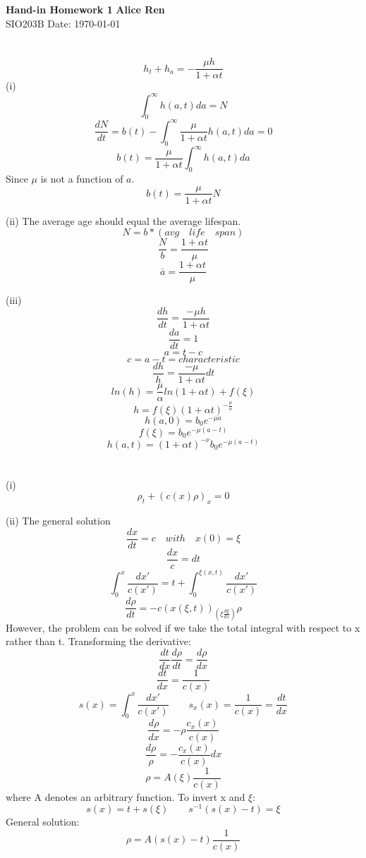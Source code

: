 \documentclass[letterpaper, 11pt]{article}
\begin{document}
\noindent
\large\textbf{Hand-in Homework 1} \hfill \textbf{Alice Ren} \\
\normalsize SIO203B \hfill Date: \today \\

\setlength{\parindent}{0pt}

\section{} %
\[h_t + h_a = -\frac{\mu h}{1+\alpha t}\]
(i)
\[\int_{0}^{\infty} h(a,t) da = N\]
\[\frac{dN}{dt} = b(t) - \int_{0}^{\infty} \frac{\mu}{1+\alpha t} h(a,t) da = 0\]
\[b(t) = \frac{\mu}{1+\alpha t} \int_{0}^{\infty} h(a,t) da \]
Since $\mu$ is not a function of $a$.
\[b(t) = \frac{\mu}{1+\alpha t} N\]

(ii)
The average age should equal the average lifespan.
\[N = b *(avg \quad life \quad span)\]
\[\frac{N}{b} = \frac{1+\alpha t}{\mu}\]
\[\bar{a} = \frac{1+\alpha t}{\mu}\]

(iii)
\[\frac{dh}{dt} = \frac{-\mu h}{1 + \alpha t}\]
\[\frac{da}{dt} = 1\]
\[a = t-c\]
\[c = a-t = characteristic\]
\[\frac{dh}{h} = \frac{-\mu}{1+\alpha t} dt\]
\[ln(h) = \frac{\mu}{\alpha}ln(1 + \alpha t) +f(\xi)\]
\[h = f(\xi)(1 + \alpha t)^{-\frac{\mu}{\alpha}}\]
\[h(a, 0) = b_0e^{-\mu a}\]
\[f(\xi) = b_0e^{-\mu (a-t)}\]
\[h(a, t) = (1+ \alpha t)^{-\nu}b_0 e^{-\mu (a-t)}\]

\section{} %

(i)
\[\rho_t + (c(x)\rho)_x = 0\]

(ii)
The general solution
\[\frac{dx}{dt} = c \quad with \quad x(0) = \xi\]
\[\frac{dx}{c} = dt\]
\[\int_{0}^{x}\frac{dx'}{c(x')} = t + \int_0^{\xi (x, t)} \frac{dx'}{c(x')} \]
\[\frac{d\rho}{dt} = -c(x(\xi,t))_{(\xi \frac{d\xi}{dx})} \rho\]
However, the problem can be solved if we take the total integral with respect to x rather than t.  Transforming the derivative:
\[\frac{dt}{dx} \frac{d\rho}{dt} = \frac{d\rho}{dx}\]
\[\frac{dt}{dx} = \frac{1}{c(x)}\]
\[s(x) = \int_{0}^{x}\frac{dx'}{c(x')} \quad \quad s_x(x) = \frac{1}{c(x)} = \frac{dt}{dx}\]
\[\frac{d\rho}{dx} = -\rho \frac{c_x(x)}{c(x)}\]
\[\frac{d\rho}{\rho} = -\frac{c_x(x)}{c(x)}dx\] 
\[\rho = A(\xi) \frac{1}{c(x)}\] where A denotes an arbitrary function.  To invert x and $\xi$:
\[s(x) = t + s(\xi) \quad \quad s^{-1}(s(x) - t) = \xi\]
General solution:
\[\rho = A(s(x) - t)\frac{1}{c(x)}\]
\end{document}
